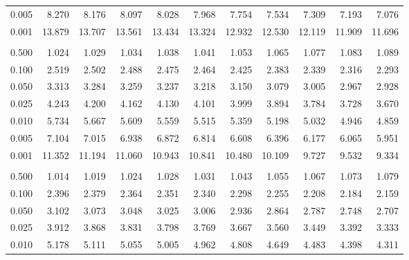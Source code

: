 \documentclass[
]{article}
\begin{document}
\begin{longtable}[t]{lrrrrrrrrrr}
\hspace{1em}0.005 & 8.270 & 8.176 & 8.097 & 8.028 & 7.968 & 7.754 & 7.534 & 7.309 & 7.193 & 7.076\\
\hspace{1em}0.001 & 13.879 & 13.707 & 13.561 & 13.434 & 13.324 & 12.932 & 12.530 & 12.119 & 11.909 & 11.696\\
\addlinespace[0.3em]
\multicolumn{11}{l}{\textbf{$k_2=8$}}\\
\hspace{1em}0.500 & 1.024 & 1.029 & 1.034 & 1.038 & 1.041 & 1.053 & 1.065 & 1.077 & 1.083 & 1.089\\
\hspace{1em}0.100 & 2.519 & 2.502 & 2.488 & 2.475 & 2.464 & 2.425 & 2.383 & 2.339 & 2.316 & 2.293\\
\hspace{1em}0.050 & 3.313 & 3.284 & 3.259 & 3.237 & 3.218 & 3.150 & 3.079 & 3.005 & 2.967 & 2.928\\
\hspace{1em}0.025 & 4.243 & 4.200 & 4.162 & 4.130 & 4.101 & 3.999 & 3.894 & 3.784 & 3.728 & 3.670\\
\hspace{1em}0.010 & 5.734 & 5.667 & 5.609 & 5.559 & 5.515 & 5.359 & 5.198 & 5.032 & 4.946 & 4.859\\
\hspace{1em}0.005 & 7.104 & 7.015 & 6.938 & 6.872 & 6.814 & 6.608 & 6.396 & 6.177 & 6.065 & 5.951\\
\hspace{1em}0.001 & 11.352 & 11.194 & 11.060 & 10.943 & 10.841 & 10.480 & 10.109 & 9.727 & 9.532 & 9.334\\
\addlinespace[0.3em]
\multicolumn{11}{l}{\textbf{$k_2=9$}}\\
\hspace{1em}0.500 & 1.014 & 1.019 & 1.024 & 1.028 & 1.031 & 1.043 & 1.055 & 1.067 & 1.073 & 1.079\\
\hspace{1em}0.100 & 2.396 & 2.379 & 2.364 & 2.351 & 2.340 & 2.298 & 2.255 & 2.208 & 2.184 & 2.159\\
\hspace{1em}0.050 & 3.102 & 3.073 & 3.048 & 3.025 & 3.006 & 2.936 & 2.864 & 2.787 & 2.748 & 2.707\\
\hspace{1em}0.025 & 3.912 & 3.868 & 3.831 & 3.798 & 3.769 & 3.667 & 3.560 & 3.449 & 3.392 & 3.333\\
\hspace{1em}0.010 & 5.178 & 5.111 & 5.055 & 5.005 & 4.962 & 4.808 & 4.649 & 4.483 & 4.398 & 4.311\\

\end{longtable}
\end{document}
